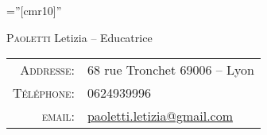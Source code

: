 \documentclass[a4paper,10pt]{article}
\begin{document}

\pagestyle{empty} %

\font\fb=''[cmr10]'' %

\par{\centering
		{\Huge \textsc{Paoletti}  Letizia -- Educatrice
	}\bigskip\par}

\begin{small}\begin{center}
\begin{tabular}{rl}
    \textsc{Addresse:}   &68 rue Tronchet 69006 – Lyon \\
    \textsc{Téléphone:}     & 0624939996\\
    \textsc{email:}     & \href{mailto:paoletti.letizia@gmail.com}{paoletti.letizia@gmail.com}
\end{tabular}\end{center}\end{small}
\end{document}
